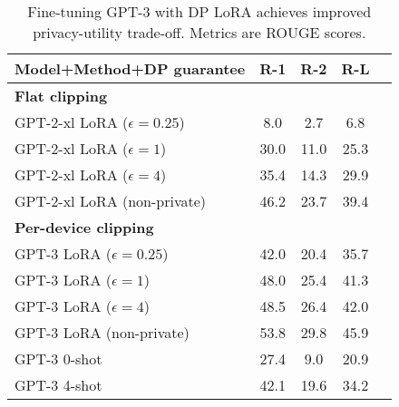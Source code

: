 \begin{table}[ht]
\centering
\footnotesize
\caption{Fine-tuning GPT-3 with DP LoRA achieves improved privacy-utility trade-off. Metrics are ROUGE scores.}
\begin{tabular}{l c ccc}\\
\toprule
Model+Method+DP guarantee & R-1 & R-2 & R-L \\
\midrule
\textbf{Flat clipping} & & & \\
\hspace{1mm} GPT-2-xl LoRA ($\epsilon= 0.25$) & 8.0 & 2.7 & 6.8 \\
\hspace{1mm} GPT-2-xl LoRA ($\epsilon=1$)     & 30.0 & 11.0 & 25.3 \\
\hspace{1mm} GPT-2-xl LoRA ($\epsilon=4$)     & 35.4 & 14.3 & 29.9 \\
GPT-2-xl LoRA (non-private)     & 46.2 & 23.7 & 39.4 \\
\midrule
\textbf{Per-device clipping} & & & \\
\hspace{1mm} GPT-3 LoRA ($\epsilon= 0.25$) & 42.0 & 20.4 & 35.7 \\
\hspace{1mm} GPT-3 LoRA ($\epsilon= 1$)    & 48.0 & 25.4 & 41.3 \\
\hspace{1mm} GPT-3 LoRA ($\epsilon= 4$)    & 48.5 & 26.4 & 42.0 \\
GPT-3 LoRA (non-private) & 53.8 & 29.8 & 45.9 \\

\midrule
GPT-3 0-shot             & 27.4 & 9.0 & 20.9 \\
GPT-3 4-shot             & 42.1 & 19.6 & 34.2 \\

\bottomrule
\end{tabular}
\label{table:gpt3_trimmed}
\end{table}
